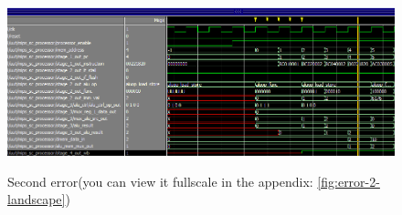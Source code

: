 \begin{figure}[h]
	\caption{Second error(you can view it fullscale in the appendix:
\ref{fig:error-2-landscape})}
	\includegraphics[scale=0.5]{figures/error_2.png}
	\label{fig:error-2-text}
\end{figure}
